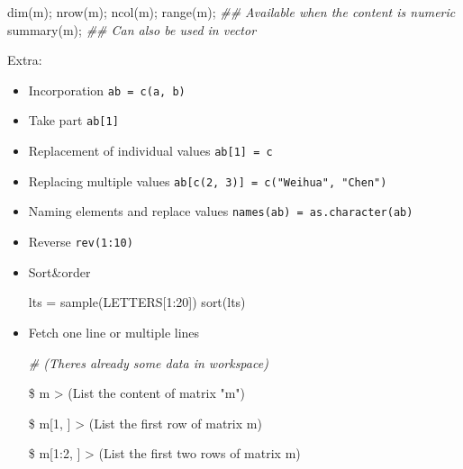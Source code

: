 \documentclass[
]{article}
\newenvironment{Shaded}{}{}
\newcommand{\CommentTok}[1]{\textcolor[rgb]{0.38,0.63,0.69}{\textit{#1}}}
\newcommand{\DecValTok}[1]{\textcolor[rgb]{0.25,0.63,0.44}{#1}}
\newcommand{\DocumentationTok}[1]{\textcolor[rgb]{0.73,0.13,0.13}{\textit{#1}}}
\newcommand{\FunctionTok}[1]{\textcolor[rgb]{0.02,0.16,0.49}{#1}}
\newcommand{\NormalTok}[1]{#1}
\newcommand{\OtherTok}[1]{\textcolor[rgb]{0.00,0.44,0.13}{#1}}
\newcommand{\SpecialCharTok}[1]{\textcolor[rgb]{0.25,0.44,0.63}{#1}}
\newcommand{\StringTok}[1]{\textcolor[rgb]{0.25,0.44,0.63}{#1}}
\begin{document}
\begin{Shaded}
\begin{Highlighting}[]
\FunctionTok{dim}\NormalTok{(m);}
\FunctionTok{nrow}\NormalTok{(m);}
\FunctionTok{ncol}\NormalTok{(m);}
\FunctionTok{range}\NormalTok{(m); }\DocumentationTok{\#\# Available when the content is numeric}
\FunctionTok{summary}\NormalTok{(m); }\DocumentationTok{\#\# Can also be used in vector}
\end{Highlighting}
\end{Shaded}

Extra:

\begin{itemize}
\item
  Incorporation \texttt{ab\ =\ c(a,\ b)}
\item
  Take part \texttt{ab{[}1{]}}
\item
  Replacement of individual values \texttt{ab{[}1{]}\ =\ c}
\item
  Replacing multiple values
  \texttt{ab{[}c(2,\ 3){]}\ =\ c("Weihua",\ "Chen")}
\item
  Naming elements and replace values
  \texttt{names(ab)\ =\ as.character(ab)}
\item
  Reverse \texttt{rev(1:10)}
\item
  Sort\&order

\begin{Shaded}
\begin{Highlighting}[]
\NormalTok{lts }\OtherTok{=} \FunctionTok{sample}\NormalTok{(LETTERS[}\DecValTok{1}\SpecialCharTok{:}\DecValTok{20}\NormalTok{])}
\FunctionTok{sort}\NormalTok{(lts)}
\end{Highlighting}
\end{Shaded}
\item
  Fetch one line or multiple lines

\begin{Shaded}
\begin{Highlighting}[]
\CommentTok{\# (There\textquotesingle{}s already some data in workspace)}

\SpecialCharTok{\$}\NormalTok{ m}
\SpecialCharTok{\textgreater{}}\NormalTok{ (List the content of matrix }\StringTok{"m"}\NormalTok{)}

\SpecialCharTok{\$}\NormalTok{ m[}\DecValTok{1}\NormalTok{, ]}
\SpecialCharTok{\textgreater{}}\NormalTok{ (List the first row of matrix }\StringTok{\textquotesingle{}m\textquotesingle{}}\NormalTok{)}

\SpecialCharTok{\$}\NormalTok{ m[}\DecValTok{1}\SpecialCharTok{:}\DecValTok{2}\NormalTok{, ]}
\SpecialCharTok{\textgreater{}}\NormalTok{ (List the first two rows of matrix }\StringTok{\textquotesingle{}m\textquotesingle{}}\NormalTok{)}
\end{Highlighting}
\end{Shaded}


\end{itemize}
\end{document}

